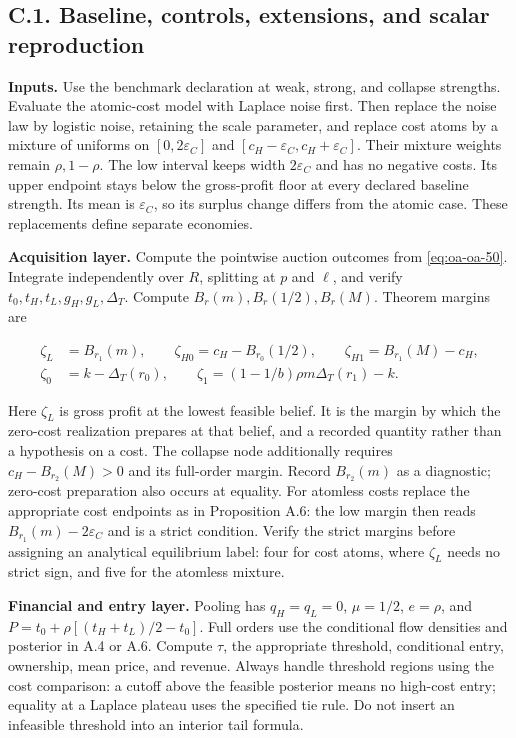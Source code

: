 \documentclass[
  11pt,
]{article}
\begin{document}
\subsection{C.1. Baseline, controls, extensions, and scalar
reproduction}\label{oa-c-baseline}

\textbf{Inputs.} Use the benchmark declaration at weak, strong, and
collapse strengths. Evaluate the atomic-cost model with Laplace noise
first. Then replace the noise law by logistic noise, retaining the scale
parameter, and replace cost atoms by a mixture of uniforms on
\([0,2\varepsilon_C]\) and \([c_H-\varepsilon_C,c_H+\varepsilon_C]\).
Their mixture weights remain \(\rho,1-\rho\). The low interval keeps
width \(2\varepsilon_C\) and has no negative costs. Its upper endpoint
stays below the gross-profit floor at every declared baseline strength.
Its mean is \(\varepsilon_C\), so its surplus change differs from the
atomic case. These replacements define separate economies.

\textbf{Acquisition layer.} Compute the pointwise auction outcomes from
\eqref{eq:oa-oa-50}. Integrate independently over \(R\), splitting at
\(p\) and \(\ell\), and verify \(t_0,t_H,t_L,g_H,g_L,\Delta_T\). Compute
\(B_r(m),B_r(1/2),B_r(M)\). Theorem margins are

\[
\begin{aligned}
\zeta_L&=B_{r_1}(m),\qquad
\zeta_{H0}=c_H-B_{r_0}(1/2),\qquad
\zeta_{H1}=B_{r_1}(M)-c_H,\\
\zeta_0&=k-\Delta_T(r_0),\qquad
\zeta_1=(1-1/b)\rho m\Delta_T(r_1)-k.
\end{aligned}
\tag{OA.77}\label{eq:oa-oa-77}
\]

Here \(\zeta_L\) is gross profit at the lowest feasible belief. It is the margin
by which the zero-cost realization prepares at that belief, and a recorded
quantity rather than a hypothesis on a cost. The collapse node additionally requires \(c_H-B_{r_2}(M)>0\) and its
full-order margin. Record \(B_{r_2}(m)\) as a diagnostic; zero-cost
preparation also occurs at equality. For atomless costs
replace the appropriate cost endpoints as in Proposition A.6: the low margin
then reads \(B_{r_1}(m)-2\varepsilon_C\) and is a strict condition. Verify the
strict margins before assigning an analytical equilibrium label: four for
cost atoms, where \(\zeta_L\) needs no strict sign, and five for the
atomless mixture.

\textbf{Financial and entry layer.} Pooling has \(q_H=q_L=0\),
\(\mu=1/2\), \(e=\rho\), and \(P=t_0+\rho[(t_H+t_L)/2-t_0]\). Full
orders use the conditional flow densities and posterior in A.4 or A.6.
Compute \(\tau\), the appropriate threshold, conditional entry,
ownership, mean price, and revenue. Always handle threshold regions
using the cost comparison: a cutoff above the feasible posterior means
no high-cost entry; equality at a Laplace plateau uses the specified tie
rule. Do not insert an infeasible threshold into an interior tail
formula.
\end{document}
